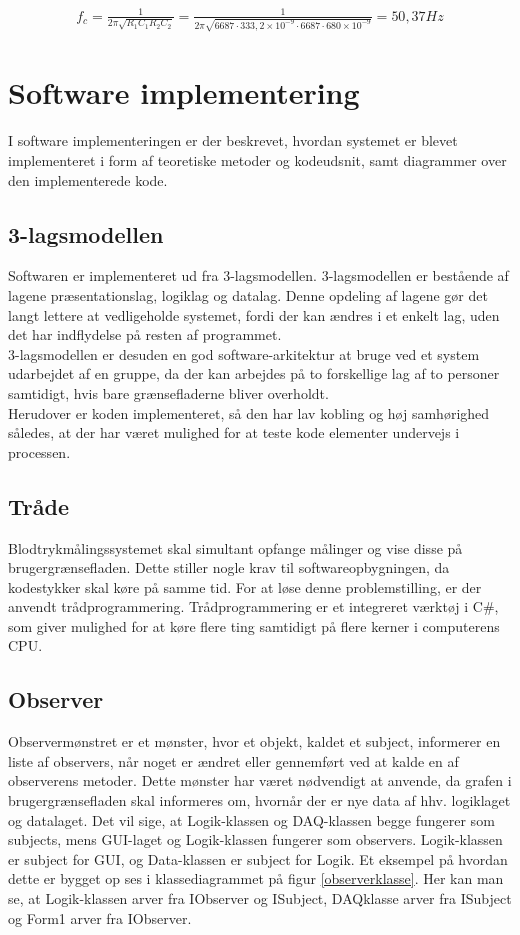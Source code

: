 \begin{align}
f_{c} = \frac{1}{2\pi \sqrt{R_{1}C_{1}R_{2}C_{2}}} = \frac{1}{2\pi \sqrt{6687 \cdot 333,2\times 10^{-9} \cdot 6687 \cdot 680\times 10^{-9}}} = 50,37 Hz
	\label{cutoff}
\end{align}

\section{Software implementering}
I software implementeringen er der beskrevet, hvordan systemet er blevet implementeret i form af teoretiske metoder og kodeudsnit, samt diagrammer over den implementerede kode.

\subsection{3-lagsmodellen}
Softwaren er implementeret ud fra 3-lagsmodellen. 3-lagsmodellen er bestående af lagene præsentationslag, logiklag og datalag. Denne opdeling af lagene gør det langt lettere at vedligeholde systemet, fordi der kan ændres i et enkelt lag, uden det har indflydelse på resten af programmet.\\ 
3-lagsmodellen er desuden en god software-arkitektur at bruge ved et system udarbejdet af en gruppe, da der kan arbejdes på to forskellige lag af to personer samtidigt, hvis bare grænsefladerne bliver overholdt.\\
Herudover er koden implementeret, så den har lav kobling og høj samhørighed således, at der har været mulighed for at teste kode elementer undervejs i processen. 

\subsection{Tråde}
Blodtrykmålingssystemet skal simultant opfange målinger og vise disse på brugergrænsefladen. Dette stiller nogle krav til softwareopbygningen, da kodestykker skal køre på samme tid. For at løse denne problemstilling, er der anvendt trådprogrammering. Trådprogrammering er et integreret værktøj i C\#, som giver mulighed for at køre flere ting samtidigt på flere kerner i computerens CPU.\\

\subsection{Observer}
Observermønstret er et mønster, hvor et objekt, kaldet et subject, informerer en liste af observers, når noget er ændret eller gennemført ved at kalde en af observerens metoder. Dette mønster har været nødvendigt at anvende, da grafen i brugergrænsefladen skal informeres om, hvornår der er nye data af hhv. logiklaget og datalaget. Det vil sige, at Logik-klassen og DAQ-klassen begge fungerer som subjects, mens GUI-laget og Logik-klassen fungerer som observers. Logik-klassen er subject for GUI, og Data-klassen er subject for Logik. Et eksempel på hvordan dette er bygget op ses i klassediagrammet på figur \ref{observerklasse}. Her kan man se, at Logik-klassen arver fra IObserver og ISubject, DAQklasse arver fra ISubject og Form1 arver fra IObserver.

